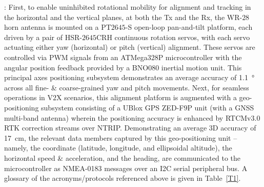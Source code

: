 \documentclass[12pt, draftcls, onecolumn]{IEEEtran}
\renewcommand{\tabcolsep}{2pt}
\begin{document}
: First, to enable uninhibited rotational mobility for alignment and tracking in the horizontal and the vertical planes, at both the Tx and the Rx, the WR-$28$ horn antenna is mounted on a PT$2645$-S open-loop pan-and-tilt platform, each driven by a pair of HSR-$2645$CRH continuous rotation servos, with each servo actuating either yaw (horizontal) or pitch (vertical) alignment. These servos are controlled via PWM signals from an ATMega$328$P microcontroller with the angular position feedback provided by a BNO$080$ inertial motion unit. This principal axes positioning subsystem demonstrates an average accuracy of \SI{1.1}{\degree} across all fine- \& coarse-grained yaw and pitch movements. Next, for seamless operations in V$2$X scenarios, this alignment platform is augmented with a geo-positioning subsystem consisting of a UBlox GPS ZED-F$9$P unit (with a GNSS multi-band antenna) wherein the positioning accuracy is enhanced by RTCMv$3.0$ RTK correction streams over NTRIP. Demonstrating an average $3$D accuracy of \SI{17}{\centi\meter}, the relevant data members captured by this geo-positioning unit -- namely, the coordinate (latitude, longitude, and ellipsoidal altitude), the horizontal speed \& acceleration, and the heading, are communicated to the microcontroller as NMEA-0183 messages over an I2C serial peripheral bus. A glossary of the acronyms/protocols referenced above is given in Table~\ref{T1}.\\
\renewcommand{\tabcolsep}{6pt}
\end{document}

